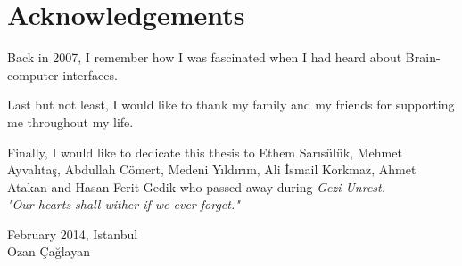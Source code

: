 \documentclass[12pt]{article}
\title{}
\numberwithin{equation}{section}
\numberwithin{figure}{section}
\numberwithin{table}{section}
\begin{document}
%



\clearpage
\vspace*{-0.35cm}
\section*{Acknowledgements}
\vspace*{6pt}
\par{
Back in 2007, I remember how I was fascinated when I had heard about Brain-computer interfaces.
}
\par{
Last but not least, I would like to thank my family and my friends for supporting me throughout my life.
}
\par{
Finally, I would like to dedicate this thesis to Ethem Sarısülük, Mehmet Ayvalıtaş, Abdullah Cömert, Medeni Yıldırım, Ali İsmail Korkmaz,
Ahmet Atakan and Hasan Ferit Gedik who passed away during \em{Gezi Unrest}.\\
"Our hearts shall wither if we ever forget."
}

\vspace*{2cm}
\begin{flushright}
February 2014, Istanbul \\
Ozan Çağlayan
\end{flushright}
\clearpage

\setcounter{tocdepth}{5}
\renewcommand\contentsname{\normalsize\bfseries Table of Contents}
\thispagestyle{empty}
\vspace*{0.15cm}
\tableofcontents
\clearpage

\renewcommand\nomname{\normalsize\bfseries List of Symbols}
\thispagestyle{empty}
\vspace*{0.15cm}
\printnomenclature
\clearpage

\renewcommand\listfigurename{\normalsize\bfseries List of Figures}
\thispagestyle{empty}
\vspace*{0.15cm}
\listoffigures
\clearpage

\renewcommand\listtablename{\normalsize\bfseries List of Tables}
\thispagestyle{empty}
\vspace*{0.15cm}
\listoftables
\clearpage
\end{document}
